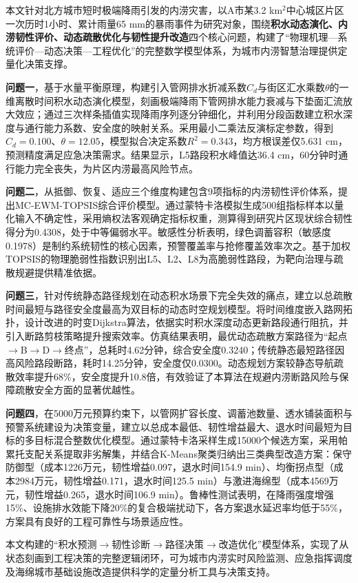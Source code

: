 \documentclass[12pt,a4paper]{article}
\begin{document}
{\fontsize{12pt}{14pt}\songti
本文针对北方城市短时极端降雨引发的内涝灾害，以A市某3.2 km$^2$中心城区片区一次历时1小时、累计雨量65 mm的暴雨事件为研究对象，围绕\textbf{积水动态演化、内涝韧性评价、动态疏散优化与韧性提升改造}四个核心问题，构建了“物理机理—系统评价—动态决策—工程优化”的完整数学模型体系，为城市内涝智慧治理提供定量化决策支撑。

\textbf{问题一}，基于水量平衡原理，构建引入管网排水折减系数$C_d$与街区汇水乘数$\theta$的一维离散时间积水动态演化模型，刻画极端降雨下管网排水能力衰减与下垫面汇流放大效应；通过三次样条插值实现降雨序列逐分钟细化，并利用分段函数建立积水深度与通行能力系数、安全度的映射关系。采用最小二乘法反演标定参数，得到$C_d = 0.100$、$\theta = 12.05$，模型拟合决定系数$R^2 = 0.343$，均方根误差仅5.631 cm，预测精度满足应急决策需求。结果显示，L5路段积水峰值达36.4 cm，60分钟时通行能力完全丧失，为片区内涝最高风险节点。

\textbf{问题二}，从抵御、恢复、适应三个维度构建包含9项指标的内涝韧性评价体系，提出MC-EWM-TOPSIS综合评价模型。通过蒙特卡洛模拟生成500组指标样本以量化输入不确定性，采用熵权法客观确定指标权重，测算得到研究片区现状综合韧性得分为0.4308，处于中等偏弱水平。敏感性分析表明，绿色调蓄容积（敏感度0.1978）是制约系统韧性的核心因素，预警覆盖率与抢修覆盖效率次之。基于加权TOPSIS的物理脆弱性指数识别出L5、L2、L8为高脆弱性路段，为靶向治理与疏散规避提供精准依据。

\textbf{问题三}，针对传统静态路径规划在动态积水场景下完全失效的痛点，建立以总疏散时间最短与路径安全度最高为双目标的动态时空规划模型。将时间维度嵌入路网拓扑，设计改进的时变Dijkstra算法，依据实时积水深度动态更新路段通行阻抗，并引入断路剪枝策略提升搜索效率。仿真结果表明，最优动态疏散方案路径为“起点$\rightarrow$B$\rightarrow$D$\rightarrow$终点”，总耗时4.62分钟，综合安全度0.3240；传统静态最短路径因高风险路段断路，耗时14.25分钟，安全度仅0.0300。动态规划方案较静态导航疏散效率提升68\%，安全度提升10.8倍，有效验证了本算法在规避内涝断路风险与保障疏散安全方面的显著优越性。

\textbf{问题四}，在5000万元预算约束下，以管网扩容长度、调蓄池数量、透水铺装面积与预警系统建设为决策变量，建立以总成本最低、韧性增益最大、退水时间最短为目标的多目标混合整数优化模型。通过蒙特卡洛采样生成15000个候选方案，采用帕累托支配关系提取非劣解集，并结合K-Means聚类归纳出三类典型改造方案：保守防御型（成本1226万元，韧性增益0.097，退水时间154.9 min）、均衡拐点型（成本2984万元，韧性增益0.171，退水时间125.5 min）与激进海绵型（成本4569万元，韧性增益0.265，退水时间106.9 min）。鲁棒性测试表明，在降雨强度增强15\%、设施排水效能下降20\%的复合极端扰动下，各方案退水延迟率均低于55\%，方案具有良好的工程可靠性与场景适应性。

本文构建的“积水预测$\rightarrow$韧性诊断$\rightarrow$路径决策$\rightarrow$改造优化”模型体系，实现了从状态刻画到工程决策的完整逻辑闭环，可为城市内涝实时风险监测、应急指挥调度及海绵城市基础设施改造提供科学的定量分析工具与决策支持。
}
\end{document}
